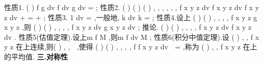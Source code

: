 \textcolor{lyred}{性质1}.
(
)
f
g dv
f dv
g dv
\alpha 
\beta 
\alpha 
\beta 
\Omega 
\Omega 
\Omega 
\pm 
=
\cdots 
\pm 
\cdots 
\int \int \int 
\int \int \int 
\int \int \int 
; 
\textcolor{lyred}{性质2}.
(
)
(
)
(
)
, ,
, ,
, ,
f x y z dv
f x y z dv
f x y z dv
\Omega +\Omega 
\Omega 
\Omega 
=
+
\int \int \int 
\int \int \int 
\int \int \int 
; 
\textcolor{lyred}{性质3}.
1 dv
\Omega 
\cdots 
=\Omega 
\int \int \int 
,一般地,
k dv
k
\Omega 
\cdots 
=\Omega 
\int \int \int 
; 
\textcolor{lyred}{性质4}.设\Omega 上
(
)
(
)
, ,
, ,
f x y z
g x y z
\le 
,则
(
)
(
)
, ,
, ,
f x y z dv
g x y z dv
\Omega 
\Omega 
\le 
\int \int \int 
\int \int \int 
; 
\textcolor{lyred}{推论}.
(
)
(
)
, ,
, ,
f x y z dv
f x y z dv
\Omega 
\Omega 
\le 
\int \int \int 
\int \int \int 
. 
\textcolor{lyred}{性质5(估值定理)}.设\Omega 上m
f
M
\le 
\le 
,则m
f dv
M
\Omega 
\cdots \Omega \le 
\le 
\cdots \Omega 
\int \int \int 
; 
\textcolor{lyred}{性质6(积分中值定理)}.设
(
)
, ,
f x y z 在\Omega 上连续,则(
)
, ,
\psi \eta 
\exists 
\in \Omega ,使得 
(
)
(
)
, ,
, ,
f
f x y z dv
\psi \eta 
\Omega 
=\Omega \int \int \int 
,称为
(
)
, ,
f x y z 在\Omega 上的\textcolor{lyred}{平均值}. 
\vspace{4pt}
{\bfseries \textcolor{lyred}{三.对称性}}

